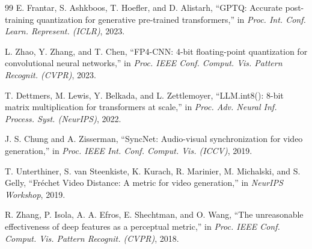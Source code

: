 \documentclass[journal,twoside]{IEEEtran}
\theoremstyle{definition}
\theoremstyle{remark}
\begin{document}
\begin{thebibliography}{99}
E. Frantar, S. Ashkboos, T. Hoefler, and D. Alistarh, ``{GPTQ}: Accurate post-training quantization for generative pre-trained transformers,'' in \textit{Proc. Int. Conf. Learn. Represent. (ICLR)}, 2023.

L. Zhao, Y. Zhang, and T. Chen, ``{FP4-CNN}: 4-bit floating-point quantization for convolutional neural networks,'' in \textit{Proc. IEEE Conf. Comput. Vis. Pattern Recognit. (CVPR)}, 2023.

T. Dettmers, M. Lewis, Y. Belkada, and L. Zettlemoyer, ``{LLM.int8()}: 8-bit matrix multiplication for transformers at scale,'' in \textit{Proc. Adv. Neural Inf. Process. Syst. (NeurIPS)}, 2022.

J. S. Chung and A. Zisserman, ``{SyncNet}: Audio-visual synchronization for video generation,'' in \textit{Proc. IEEE Int. Conf. Comput. Vis. (ICCV)}, 2019.

T. Unterthiner, S. van Steenkiste, K. Kurach, R. Marinier, M. Michalski, and S. Gelly, ``Fréchet Video Distance: A metric for video generation,'' in \textit{NeurIPS Workshop}, 2019.

R. Zhang, P. Isola, A. A. Efros, E. Shechtman, and O. Wang, ``The unreasonable effectiveness of deep features as a perceptual metric,'' in \textit{Proc. IEEE Conf. Comput. Vis. Pattern Recognit. (CVPR)}, 2018.

\end{thebibliography}
\end{document}

